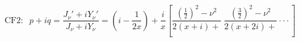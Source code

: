 \documentclass[12pt]{article}
\begin{document}
\begin{displaymath}
\textrm{CF2}:\;\;
p + iq = \frac{J_\nu'+iY_\nu'}{J_\nu+iY_\nu}
       = \left(i-\frac{1}{2x}\right) + \frac{i}{x}
         \left[\frac{\left(\frac{1}{2}\right)^2-\nu^2}{2(x+i)+} \;
         \frac{\left(\frac{3}{2}\right)^2-\nu^2}{2(x+2i)+} \cdot\cdot\cdot\right]
\end{displaymath}
\end{document}
